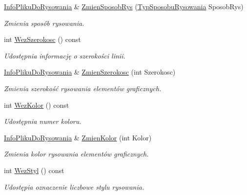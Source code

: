 \begin{DoxyCompactItemize}
\mbox{\hyperlink{class_pz_g_1_1_info_pliku_do_rysowania}{Info\+Pliku\+Do\+Rysowania}} \& \mbox{\hyperlink{class_pz_g_1_1_info_pliku_do_rysowania_a4245bff195e0d6d382ed7d776b5ad645}{Zmien\+Sposob\+Rys}} (\mbox{\hyperlink{namespace_pz_g_a53d89f50686ddd39301f9706cc1247dc}{Typ\+Sposobu\+Rysowania}} Sposob\+Rys)
\begin{DoxyCompactList}\small\item\em Zmienia sposób rysowania. \end{DoxyCompactList}\item 
int \mbox{\hyperlink{class_pz_g_1_1_info_pliku_do_rysowania_a627bb615c50f3b03374774e6b974488b}{Wez\+Szerokosc}} () const
\begin{DoxyCompactList}\small\item\em Udostępnia informację o szerokości linii. \end{DoxyCompactList}\item 
\mbox{\hyperlink{class_pz_g_1_1_info_pliku_do_rysowania}{Info\+Pliku\+Do\+Rysowania}} \& \mbox{\hyperlink{class_pz_g_1_1_info_pliku_do_rysowania_aa6d4c0fa70db640fde80091aefa1326c}{Zmien\+Szerokosc}} (int Szerokosc)
\begin{DoxyCompactList}\small\item\em Zmienia szerokość rysowania elementów graficznych. \end{DoxyCompactList}\item 
int \mbox{\hyperlink{class_pz_g_1_1_info_pliku_do_rysowania_a137081c82c29acd7df02badb27c8a2cf}{Wez\+Kolor}} () const
\begin{DoxyCompactList}\small\item\em Udostępnia numer koloru. \end{DoxyCompactList}\item 
\mbox{\hyperlink{class_pz_g_1_1_info_pliku_do_rysowania}{Info\+Pliku\+Do\+Rysowania}} \& \mbox{\hyperlink{class_pz_g_1_1_info_pliku_do_rysowania_af5c256daaa945a31a1f137c9b429bc37}{Zmien\+Kolor}} (int Kolor)
\begin{DoxyCompactList}\small\item\em Zmienia kolor rysowania elementów graficznych. \end{DoxyCompactList}\item 
int \mbox{\hyperlink{class_pz_g_1_1_info_pliku_do_rysowania_acf5b136a9ee8a3308fdba974d0eebd9a}{Wez\+Styl}} () const
\begin{DoxyCompactList}\small\item\em Udostępia oznaczenie liczbowe stylu rysowania. \end{DoxyCompactList}\item 

\end{DoxyCompactItemize}

